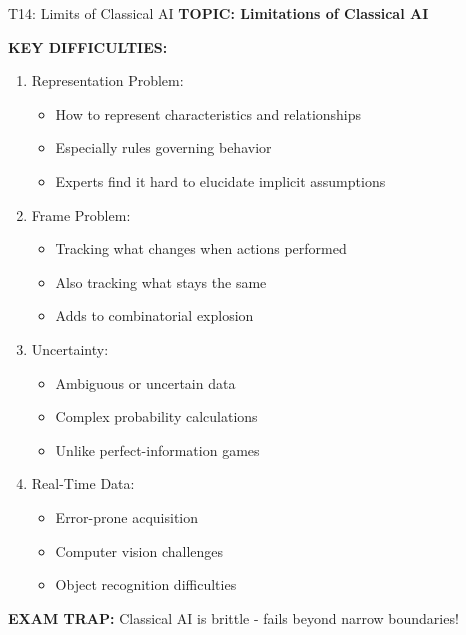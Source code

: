 \documentclass[8pt]{beamer}
\begin{document}
	\begin{frame}{T14: Limits of Classical AI}
		\fontsize{6.5}{7.5}\selectfont
		\textbf{TOPIC: Limitations of Classical AI}
		
		\vspace{0.1cm}
		\textbf{KEY DIFFICULTIES:}
		\begin{enumerate}
			\item \textcolor{myblue}{Representation Problem:}
			\begin{itemize}
				\item How to represent characteristics and relationships
				\item Especially rules governing behavior
				\item Experts find it hard to elucidate implicit assumptions
			\end{itemize}
			\item \textcolor{myblue}{Frame Problem:}
			\begin{itemize}
				\item Tracking what changes when actions performed
				\item Also tracking what stays the same
				\item Adds to combinatorial explosion
			\end{itemize}
			\item \textcolor{myblue}{Uncertainty:}
			\begin{itemize}
				\item Ambiguous or uncertain data
				\item Complex probability calculations
				\item Unlike perfect-information games
			\end{itemize}
			\item \textcolor{myblue}{Real-Time Data:}
			\begin{itemize}
				\item Error-prone acquisition
				\item Computer vision challenges
				\item Object recognition difficulties
			\end{itemize}
		\end{enumerate}
		
		\textcolor{myred}{\textbf{EXAM TRAP:}} Classical AI is \textcolor{myblue}{brittle - fails beyond narrow boundaries}!
	\end{frame}
	
\end{document}

